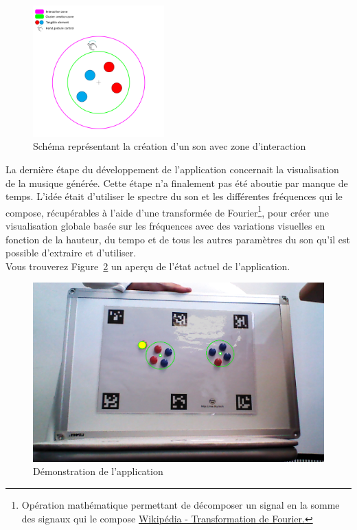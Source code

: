 \begin{figure}[H]
\centering
\includegraphics[width=0.45\textwidth]{images/reartable_cluster_interaction}
\caption{Schéma représentant la création d'un son avec zone d'interaction}
\label{fig:reartable:interactionzone}
\end{figure}

La dernière étape du développement de l'application concernait la visualisation de la musique générée. Cette étape n'a finalement pas été aboutie par manque de temps. L'idée était d'utiliser le spectre du son et les différentes fréquences qui le compose, récupérables à l'aide d'une transformée de Fourier\cite{bracewell1986fourier}\footnote{Opération mathématique permettant de décomposer un signal en la somme des signaux qui le compose \href{https://fr.wikipedia.org/wiki/Transformation_de_Fourier}{Wikipédia - Transformation de Fourier.}}, pour créer une visualisation globale basée sur les fréquences avec des variations visuelles en fonction de la hauteur, du tempo et de tous les autres paramètres du son qu'il est possible d'extraire et d'utiliser.\\

Vous trouverez Figure~\ref{fig:reartable:demo} un aperçu de l'état actuel de l'application. 

\begin{figure}[H]
\centering
\includegraphics[width=0.65\linewidth]{images/reartable}
\caption{Démonstration de l'application}
\label{fig:reartable:demo}
\end{figure}

